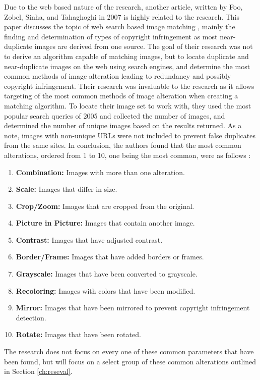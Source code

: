 Due to the web based nature of the research, another article, written by Foo, Zobel, Sinha, and Tahaghoghi in 2007 is highly related to the research. This paper discusses the topic of web search based image matching \cite{Foo:2007}, mainly the finding and determination of types of copyright infringement as most near-duplicate images are derived from one source. The goal of their research was not to derive an algorithm capable of matching images, but to locate duplicate and near-duplicate images on the web using search engines, and determine the most common methods of image alteration leading to redundancy and possibly copyright infringement. Their research was invaluable to the research as it allows targeting of the most common methods of image alteration when creating a matching algorithm. To locate their image set to work with, they used the most popular search queries of 2005 and collected the number of images, and determined the number of unique images based on the results returned. As a note, images with non-unique URLs were not included to prevent false duplicates from the same sites. In conclusion, the authors found that the most common alterations, ordered from 1 to 10, one being the most common, were as follows \cite{Foo:2007}:
\begin{enumerate}
\item
\textbf{Combination:} Images with more than one alteration.
\item
\textbf{Scale:} Images that differ in size.
\item
\textbf{Crop/Zoom:} Images that are cropped from the original.
\item
\textbf{Picture in Picture:} Images that contain another image.
\item
\textbf{Contrast:} Images that have adjusted contrast.
\item
\textbf{Border/Frame:} Images that have added borders or frames.
\item
\textbf{Grayscale:} Images that have been converted to grayscale.
\item
\textbf{Recoloring:} Images with colors that have been modified.
\item
\textbf{Mirror:} Images that have been mirrored to prevent copyright infringement detection.
\item
\textbf{Rotate:} Images that have been rotated.
\end{enumerate}

The research does not focus on every one of these common parameters that have been found, but will focus on a select group of these common alterations outlined in Section \ref{ch:reseval}.

